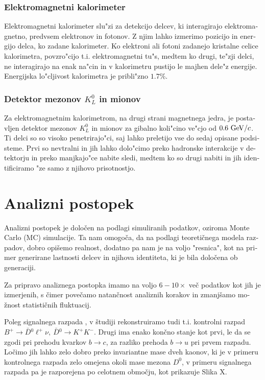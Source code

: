 \begin{otherlanguage}{slovene}
\subsubsection{Elektromagnetni kalorimeter}
Elektromagnetni kalorimeter slu"zi za detekcijo delcev, ki interagirajo elektromagnetno, predvsem elektronov in fotonov. Z njim lahko izmerimo pozicijo in energijo delca, ko zadane kalorimeter. Ko elektroni ali fotoni zadanejo kristalne celice kalorimetra, povzro"cijo t.i. elektromagnetni tu"s, medtem ko drugi, te"zji delci, ne interagirajo na enak na"cin in v kalorimetru pustijo le majhen dele"z energije. Energijska lo"cljivost kalorimetra je pribli"zno $1.7\%$.

\subsubsection{Detektor mezonov $K_L^0$ in mionov}
Za elektromagnetnim kalorimetrom, na drugi strani magnetnega jedra, je postavljen detektor mezonov $K_L^0$ in mionov za gibalno koli"cino ve"cjo od $0.6\mathrm{~GeV}/c$. Ti delci so so visoko penetrirajo"ci, saj lahko preletijo vse do sedaj opisane podsisteme. Prvi so nevtralni in jih lahko dolo"cimo preko hadronske interakcije v detektorju in preko manjkajo"ce nabite sledi, medtem ko so drugi nabiti in jih identificiramo "ze samo z njihovo prisotnostjo.

\section{Analizni postopek}
Analizni postopek je določen na podlagi simuliranih podatkov, oziroma Monte Carlo (MC) simulacije. Ta nam omogoča, da na podlagi teoretičnega modela razpadov, dobro opišemo realnost, dodatno pa nam je na voljo "resnica", kot na primer generirane lastnosti delcev in njihova identiteta, ki je bila določena ob generaciji.

Za pripravo analiznega postopka imamo na voljo $6-10\times$ več podatkov kot jih je izmerjenih, s čimer povečamo natančnost analiznih korakov in zmanjšamo možnost statističnih fluktuacij.

Poleg signalnega razpada \decayb, v študiji rekonstruiramo tudi t.i. kontrolni razpad $B^+ \to \bar D {}^0 \ell^+ \nu,~\bar D{}^0 \to K^+K^-$. Drugi ima enako končno stanje kot prvi, le da se zgodi pri prehodu kvarkov $b \to c$, za razliko prehoda $b \to u$ pri prvem razpadu. Ločimo jih lahko zelo dobro preko invariantne mase dveh kaonov, ki je v primeru kontrolnega razpada zelo omejena okoli mase mezona $D^0$, v primeru signalnega razpada pa je razporejena po celotnem območju, kot prikazuje Slika X.


\end{otherlanguage}
